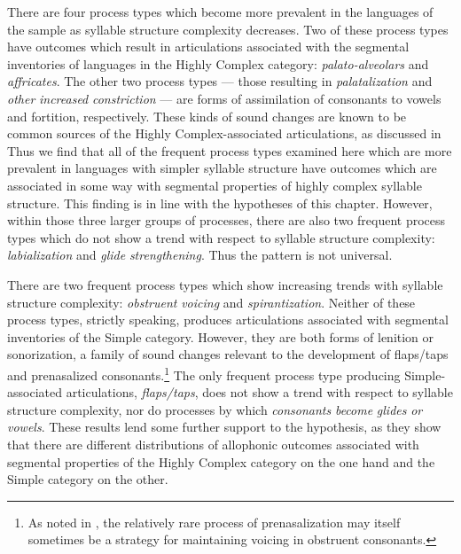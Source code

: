   There are four process types which become more prevalent in the languages of the sample as syllable structure complexity decreases. Two of these process types have outcomes which result in articulations associated with the segmental inventories of languages in the Highly Complex category: \textit{palato-alveolars} and \textit{affricates}. The other two process types — those resulting in \textit{palatalization} and \textit{other} \textit{increased} \textit{constriction} — are forms of assimilation of consonants to vowels and fortition, respectively. These kinds of sound changes are known to be common sources of the Highly Complex-associated articulations, as discussed in  Thus we find that all of the frequent process types examined here which are more prevalent in languages with simpler syllable structure have outcomes which are associated in some way with segmental properties of highly complex syllable structure. This finding is in line with the hypotheses of this chapter. However, within those three larger groups of processes, there are also two frequent process types which do not show a trend with respect to syllable structure complexity: \textit{labialization} and \textit{glide} \textit{strengthening}. Thus the pattern is not universal.



  There are two frequent process types which show increasing trends with syllable structure complexity: \textit{obstruent} \textit{voicing} and \textit{spirantization}. Neither of these process types, strictly speaking, produces articulations associated with segmental inventories of the Simple category. However, they are both forms of lenition or sonorization, a family of sound changes relevant to the development of flaps/taps and prenasalized consonants.\footnote{ \textrm{As noted in , the relatively rare process of prenasalization may itself sometimes be a strategy for maintaining voicing in obstruent consonants.}} The only frequent process type producing Simple-associated articulations, \textit{flaps/taps}, does not show a trend with respect to syllable structure complexity, nor do processes by which \textit{consonants} \textit{become} \textit{glides} \textit{or} \textit{vowels}. These results lend some further support to the hypothesis, as they show that there are different distributions of allophonic outcomes associated with segmental properties of the Highly Complex category on the one hand and the Simple category on the other.




